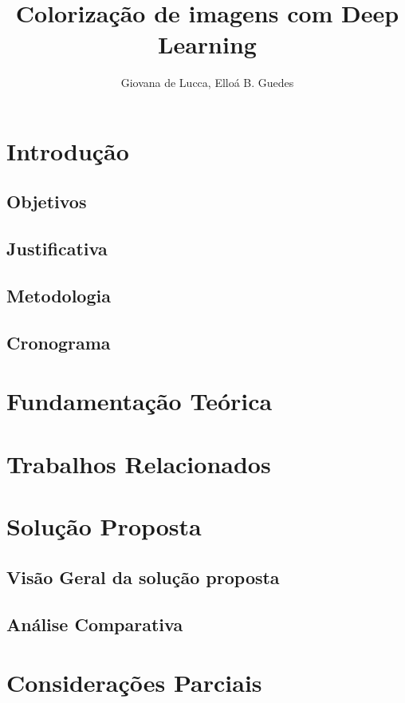 \documentclass[12pt]{article}
\title{Colorização de imagens com Deep Learning}
\author{Giovana de Lucca, Elloá B. Guedes}
\begin{document}
\maketitle

\section{Introdução}


\subsection{Objetivos}


\subsection{Justificativa} \label{sec:jutificativa}


\subsection{Metodologia} \label{sec:metodologia}


\subsection{Cronograma} \label{sec:cronograma}


\section{Fundamentação Teórica} \label{sec:fundamentacao}


\section{Trabalhos Relacionados} \label{sec:relacionados}


\section{Solução Proposta} \label{sec:solucao}


\subsection{Visão Geral da solução proposta} \label{sec:visaogeral}


\subsection{Análise Comparativa} \label{sec:analise}


\section{Considerações Parciais} \label{sec:consideracoes}





\end{document}
